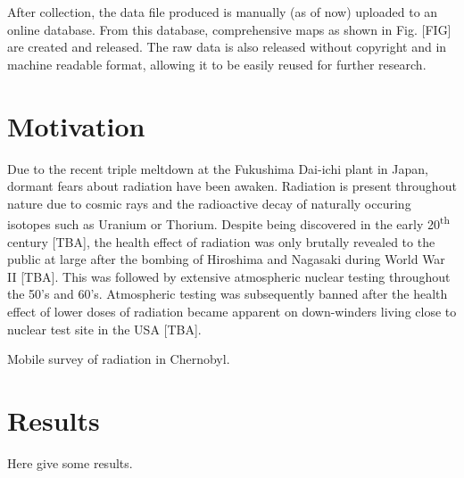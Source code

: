 \documentclass[11pt]{article}
\begin{document}
After collection, the data file produced is manually (as of now) uploaded to an online database. From this database, comprehensive maps as shown in Fig. [FIG] 
are created and released. The raw data is also released without copyright and in machine readable format, allowing it to be easily reused for further research.


\section*{Motivation}
\label{sec:motivation}

Due to the recent triple meltdown at the Fukushima Dai-ichi plant in Japan, dormant fears about radiation have been awaken.
Radiation is present throughout nature due to cosmic rays and the radioactive decay of naturally occuring isotopes such as Uranium or Thorium.
Despite being discovered in the early 20\textsuperscript{th} century [TBA], the health effect of radiation was only brutally revealed to the public at
large after the bombing of Hiroshima and Nagasaki during World War II [TBA]. This was followed by extensive atmospheric nuclear testing throughout the 50's and 60's.
Atmospheric testing was subsequently banned after the health effect of lower doses of radiation became apparent on down-winders living close to
nuclear test site in the USA [TBA].

Mobile survey of radiation in Chernobyl\cite{arvela1990mobile}.

\section*{Results}
\label{sec:results}

Here give some results.

\begin{figure}[ht]
\centering
{}
\end{figure}
\end{document}
